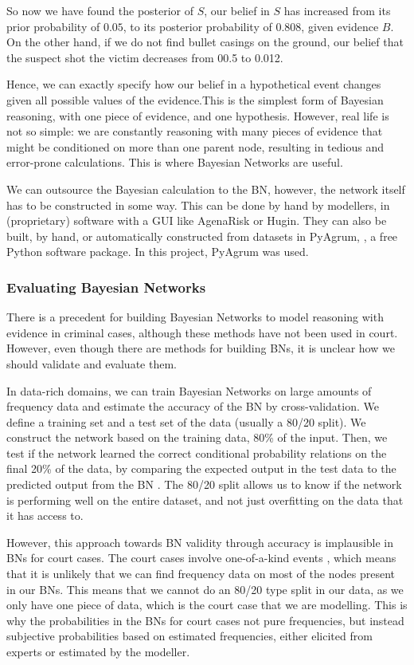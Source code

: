 \documentclass[11pt]{article}
\begin{document}
So now we have found the posterior of $S$, our belief in $S$ has increased from its prior probability of $0.05$, to its posterior probability of $0.808$, given evidence $B$. On the other hand, if we do not find bullet casings on the ground, our belief that the suspect shot the victim decreases from 00.5 to 0.012. 

Hence, we can exactly specify how our belief in a hypothetical event changes given all possible values of the evidence.This is the simplest form of Bayesian reasoning, with one piece of evidence, and one hypothesis. However, real life is not so simple: we are constantly reasoning with many pieces of evidence that might be conditioned on more than one parent node, resulting in tedious and error-prone calculations. This is where Bayesian Networks are useful. 

We can outsource the Bayesian calculation to the BN, however, the network itself has to be constructed in some way. This can be done by hand by modellers, in (proprietary) software with a GUI like AgenaRisk or Hugin. They can also be built, by hand, or automatically constructed from datasets in PyAgrum, \citep{pyagrum2020}, a free Python software package. In this project, PyAgrum was used.

\subsubsection{Evaluating Bayesian Networks}

There is a precedent for building Bayesian Networks to model reasoning with evidence in criminal cases, although these methods have not been used in court. However, even though there are methods for building BNs, it is unclear how we should validate and evaluate them. 

In data-rich domains, we can train Bayesian Networks on large amounts of frequency data and estimate the accuracy of the BN by cross-validation. We define a training set and a test set of the data (usually a 80/20 split). We construct the network based on the training data, 80\% of the input. Then, we test if the network learned the correct conditional probability relations on the final 20\% of the data, by comparing the expected output in the test data to the predicted output from the BN \citep{chen2012}. The 80/20 split allows us to know if the network is performing well on the entire dataset, and not just overfitting on the data that it has access to.

However, this approach towards BN validity through accuracy is implausible in BNs for court cases. The court cases involve one-of-a-kind events \citep{schum1982}, which means that it is unlikely that we can find frequency data on most of the nodes present in our BNs. This means that we cannot do an 80/20 type split in our data, as we only have one piece of data, which is the court case that we are modelling. This is why the probabilities in the BNs for court cases not pure frequencies, but instead subjective probabilities based on estimated frequencies, either elicited from experts or estimated by the modeller.
\end{document}
